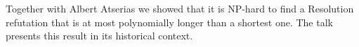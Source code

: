 \documentclass[bsl,meeting]{asl}
\def\urladdr#1{\endgraf\noindent{\it URL Address}: {\tt #1}.}
\newcommand{\NP}{}
\begin{document}
\thispagestyle{empty}


\NP%
%
%
%
%


Together with Albert Atserias we showed that it is NP-hard to find a Resolution refutation that is at most polynomially longer than a shortest one. The talk presents this result in its historical context.
\end{document}

